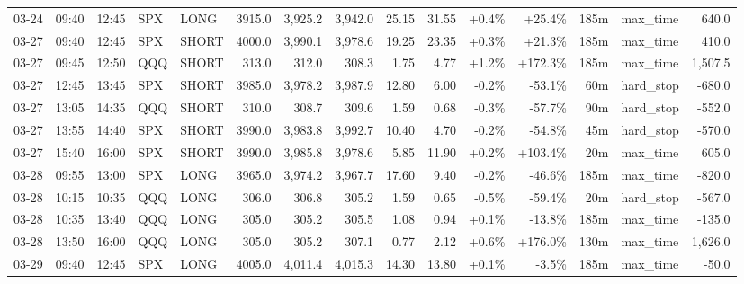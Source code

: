 \documentclass[11pt,a4paper,twoside]{article}
\begin{document}
\begin{landscape}
\begin{center}
\begin{longtable}{>{\color{txtmain}}l l l l l r r r r r r r r >{\color{txtmain}}l r}
03-24 & 09:40 & 12:45 & SPX & LONG & 3915.0 & 3,925.2 & 3,942.0 & 25.15 & 31.55 & \textcolor{wingreen}{+0.4\%} & \textcolor{wingreen}{+25.4\%} & 185m & max\_time & \textcolor{wingreen}{640.0} \\
03-27 & 09:40 & 12:45 & SPX & SHORT & 4000.0 & 3,990.1 & 3,978.6 & 19.25 & 23.35 & \textcolor{wingreen}{+0.3\%} & \textcolor{wingreen}{+21.3\%} & 185m & max\_time & \textcolor{wingreen}{410.0} \\
03-27 & 09:45 & 12:50 & QQQ & SHORT & 313.0 & 312.0 & 308.3 & 1.75 & 4.77 & \textcolor{wingreen}{+1.2\%} & \textcolor{wingreen}{+172.3\%} & 185m & max\_time & \textcolor{wingreen}{1,507.5} \\
03-27 & 12:45 & 13:45 & SPX & SHORT & 3985.0 & 3,978.2 & 3,987.9 & 12.80 & 6.00 & \textcolor{lossred}{-0.2\%} & \textcolor{lossred}{-53.1\%} & 60m & hard\_stop & \textcolor{lossred}{-680.0} \\
03-27 & 13:05 & 14:35 & QQQ & SHORT & 310.0 & 308.7 & 309.6 & 1.59 & 0.68 & \textcolor{lossred}{-0.3\%} & \textcolor{lossred}{-57.7\%} & 90m & hard\_stop & \textcolor{lossred}{-552.0} \\
03-27 & 13:55 & 14:40 & SPX & SHORT & 3990.0 & 3,983.8 & 3,992.7 & 10.40 & 4.70 & \textcolor{lossred}{-0.2\%} & \textcolor{lossred}{-54.8\%} & 45m & hard\_stop & \textcolor{lossred}{-570.0} \\
03-27 & 15:40 & 16:00 & SPX & SHORT & 3990.0 & 3,985.8 & 3,978.6 & 5.85 & 11.90 & \textcolor{wingreen}{+0.2\%} & \textcolor{wingreen}{+103.4\%} & 20m & max\_time & \textcolor{wingreen}{605.0} \\
03-28 & 09:55 & 13:00 & SPX & LONG & 3965.0 & 3,974.2 & 3,967.7 & 17.60 & 9.40 & \textcolor{lossred}{-0.2\%} & \textcolor{lossred}{-46.6\%} & 185m & max\_time & \textcolor{lossred}{-820.0} \\
03-28 & 10:15 & 10:35 & QQQ & LONG & 306.0 & 306.8 & 305.2 & 1.59 & 0.65 & \textcolor{lossred}{-0.5\%} & \textcolor{lossred}{-59.4\%} & 20m & hard\_stop & \textcolor{lossred}{-567.0} \\
03-28 & 10:35 & 13:40 & QQQ & LONG & 305.0 & 305.2 & 305.5 & 1.08 & 0.94 & \textcolor{wingreen}{+0.1\%} & \textcolor{lossred}{-13.8\%} & 185m & max\_time & \textcolor{lossred}{-135.0} \\
03-28 & 13:50 & 16:00 & QQQ & LONG & 305.0 & 305.2 & 307.1 & 0.77 & 2.12 & \textcolor{wingreen}{+0.6\%} & \textcolor{wingreen}{+176.0\%} & 130m & max\_time & \textcolor{wingreen}{1,626.0} \\
03-29 & 09:40 & 12:45 & SPX & LONG & 4005.0 & 4,011.4 & 4,015.3 & 14.30 & 13.80 & \textcolor{wingreen}{+0.1\%} & \textcolor{lossred}{-3.5\%} & 185m & max\_time & \textcolor{lossred}{-50.0} \\

\end{longtable}
\end{center}
\end{landscape}
\end{document}
